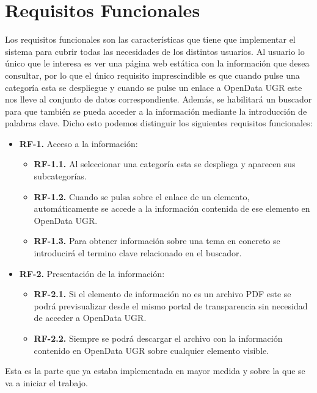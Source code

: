 \section{Requisitos Funcionales}

Los requisitos funcionales son las características que tiene que implementar el sistema para cubrir todas las necesidades de 
los distintos usuarios. Al usuario lo único que le interesa es ver una página web estática con la información que desea 
consultar, por lo que el único requisito imprescindible es que cuando pulse una categoría esta se despliegue y cuando se 
pulse un enlace a OpenData UGR este nos lleve al conjunto de datos correspondiente. Además, se habilitará un buscador para que
también se pueda acceder a la información mediante la introducción de palabras clave. Dicho esto podemos distinguir los
siguientes requisitos funcionales:

\begin{itemize}
  \item \textbf{RF-1.} Acceso a la información:
  \begin{itemize}
    \item \textbf{RF-1.1.} Al seleccionar una categoría esta se despliega y aparecen sus subcategorías.
    \item \textbf{RF-1.2.} Cuando se pulsa sobre el enlace de un elemento, automáticamente se accede a la información contenida de ese
    elemento en OpenData UGR.
    \item \textbf{RF-1.3.} Para obtener información sobre una tema en concreto se introducirá el termino clave relacionado en 
    el buscador.
    \end{itemize}
\end{itemize}

\begin{itemize}
  \item \textbf{RF-2.} Presentación de la información:
  \begin{itemize}
    \item \textbf{RF-2.1.} Si el elemento de información no es un archivo PDF este se podrá previsualizar desde el mismo portal
    de transparencia sin necesidad de acceder a OpenData UGR.
    \item \textbf{RF-2.2.} Siempre se podrá descargar el archivo con la información contenido en OpenData UGR sobre cualquier 
    elemento visible.
  \end{itemize}
\end{itemize}
	
Esta es la parte que ya estaba implementada en mayor medida y sobre la que se va a iniciar el trabajo.

